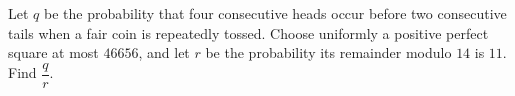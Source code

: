 Let $q$ be the probability that four consecutive heads occur before two consecutive tails when a fair coin is repeatedly tossed. Choose uniformly a positive perfect square at most $46656$, and let $r$ be the probability its remainder modulo $14$ is $11$. Find $\dfrac{q}{r}$.
